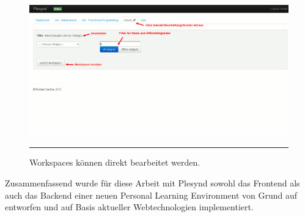 \begin{figure}
  \centering
  \includegraphics[]{./Figures/plesynd_workspace_edit.png}
    \rule{35em}{0.5pt}
  \caption[Plesynd User"=Interface: Bearbeiten von Workspaces]{Workspaces können direkt bearbeitet werden.}
  \label{fig:plesynd_workspace_edit}
\end{figure}

Zusammenfassend wurde für diese Arbeit mit Plesynd sowohl das Frontend als auch das Backend einer neuen Personal Learning Environment von Grund auf entworfen und auf Basis aktueller Webtechnologien implementiert.
